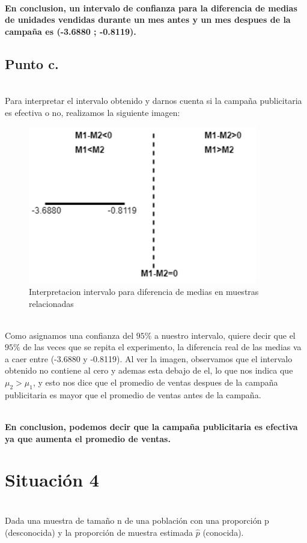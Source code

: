 \documentclass[letterpaper,12pt,onecolumn,titlepage]{article}
\begin{document}
~\\ \textbf{En conclusion, un intervalo de confianza para la diferencia de medias de unidades vendidas durante un mes antes y un mes despues de la campa\~{n}a es (-3.6880 ; -0.8119).}

\pagebreak
\subsection{Punto c.}
~\\ Para interpretar el intervalo obtenido y darnos cuenta si la campa\~{n}a publicitaria es efectiva o no, realizamos la siguiente imagen:
\begin{figure}[!h]
    \begin{center}
        \includegraphics[width=10cm]{Figuras/Grafico3.png}
        \caption{Interpretacion intervalo para diferencia de medias en muestras relacionadas}
        \label{fig:Densidad}
    \end{center}
\end{figure}

~\\ Como asignamos una confianza del $95\%$ a nuestro intervalo, quiere decir que el $95\%$ de las veces que se repita el experimento, la diferencia real de las medias va a caer entre (-3.6880 y -0.8119). Al ver la imagen, observamos que el intervalo obtenido no contiene al cero y ademas esta debajo de el, lo que nos indica que $\mu_2>\mu_1$, y esto nos dice que el promedio de ventas despues de la campa\~{n}a publicitaria es mayor que el promedio de ventas antes de la campa\~{n}a. 

~\\ \textbf{En conclusion, podemos decir que la campa\~{n}a publicitaria es efectiva ya que aumenta el promedio de ventas.}

\pagebreak\section{Situaci\'{o}n 4}
~\\ Dada una muestra de tama\~{n}o n de una poblaci\'{o}n con una proporci\'{o}n p (desconocida) y
la proporci\'{o}n de muestra estimada  $\hat{p}$ (conocida).
\end{document}
